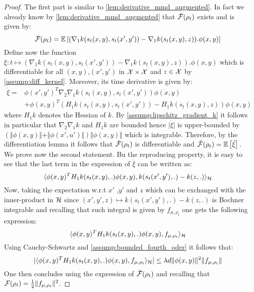 \begin{proof}
The first part is similar to \cref{lem:derivative_mmd_augmented}. In fact we already know by \cref{lem:derivative_mmd_augmented} that $\dot{{{\mathcal F}}}(\rho_t)$ exists and is given by:
\[
\dot{{{\mathcal F}}}(\rho_t) = \mathbb{E}\left[(\nabla_1 k(s_t(x,y),s_t(x',y'))-\nabla_1 k(s_t(x,y),z)).\phi(x,y)\right]
\]
Define now the function $\xi : t\mapsto (\nabla_1 k(s_t(x,y),s_t(x',y'))-\nabla_1 k(s_t(x,y),z)).\phi(x,y)$ which is differentiable for all $(x,y)$,$(x',y')$ in ${{\mathcal X}}\times {{\mathcal X}}$ and $z\in {{\mathcal X}}$ by \cref{assump:diff_kernel}. Moreover, its time derivative is given by:
\begin{align}
	\dot{\xi} =& \phi(x',y')^T \nabla_2\nabla_1k(s_t(x,y),s_t(x',y'))\phi(x,y) \\
	&+ \phi(x,y)^T(H_1k(s_t(x,y),s_t(x',y') ) - H_1k(s_t(x,y),z ))\phi(x,y)  
\end{align}
where $H_1 k$ denotes the Hessian of $k$. By \cref{assump:lipschitz_gradient_k} it follows in particular that $\nabla_2\nabla_1k$ and $H_1k$ are bounded hence $\vert \dot{\xi} \vert$  is upper-bounded by $ (\Vert \phi(x,y) \Vert + \Vert\phi(x',u') \Vert)\Vert \phi(x,y)\Vert$ which is integrable.
Therefore, by the differentiation lemma \cite[Theorem 6.28]{Klenke:2008} it follows that $\dot{{{\mathcal F}}}(\rho_t)$ is differentiable and $\ddot{{{\mathcal F}}}(\rho_t) = \mathbb{E}\left[\dot{\xi}\right].$
We prove now the second statement. Bu the reproducing property, it is easy to see that the last term in the expression of $\dot{\xi}$ can be written as:
\[
\langle \phi(x,y)^TH_1 k(s_t(x,y),.)\phi(x,y), k(s_t(x',y'),.)-  k(z,.)\rangle_{{{\mathcal H}}} 
\]
Now, taking the expectation w.r.t $x'$  ,$y'$ and $z$ which can be exchanged with the inner-product in ${{\mathcal H}}$ since  $(x',y',z)\mapsto k(s_t(x',y'),.)-  k(z,.)$ is Bochner integrable \cite[Definition 1, Theorem 6]{Retherford:1978} and recalling that such integral is given by $f_{\mu,\rho_t}$  one gets the following expression:
\[
 \langle  \phi(x,y)^TH_1 k(s_t(x,y),.)\phi(x,y), f_{\mu,\rho_t} \rangle_{{{\mathcal H}}}
\]
Using Cauchy-Schwartz and \cref{assump:bounded_fourth_oder} it follows that:
\[
\vert \langle  \phi(x,y)^TH_1 k(s_t(x,y),.)\phi(x,y), f_{\mu,\rho_t} \rangle_{{{\mathcal H}}}\vert \leq \lambda d\Vert \phi(x,y)\Vert^2 \Vert f_{\mu,\rho_t}\Vert 
\]
One then concludes using the expression of $\ddot{{{\mathcal F}}}(\rho_t)$ and recalling that ${{\mathcal F}}(\rho_t) = \frac{1}{2}\Vert f_{\mu,\rho_t} \Vert^2$.
\end{proof}


